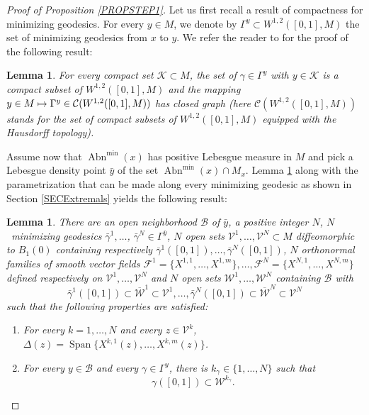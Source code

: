 \documentclass[JEP,XML,SOM,Unicode,NoFloatCountersInSection,published]{cedram}
\newenvironment{enumeratei}
{\bgroup\def\theenumi{\roman{enumi}}\def\theenumii{\arabic{enumii}}\begin{enumerate}}
{\end{enumerate}\egroup}
\newcommand\mto{\mathchoice{\longmapsto}{\mapsto}{\mapsto}{\mapsto}}
\DeclareMathOperator{\Abn}{Abn}
\DeclareMathOperator{\Span}{Span}
\newtheorem{lemma}[theorem]{Lemma}
\theoremstyle{definition}
\begin{document}
\begin{proof}[Proof of Proposition \ref{PROPSTEP1}]
Let us first recall a result of compactness for minimizing geodesics. For every $y\in M$, we denote by $\Gamma^y \subset W^{1,2}([0,1],M)$ the set of minimizing geodesics from $x$ to $y$. We refer the reader to \cite{agrachev01,riffordbook} for the proof of the following result:

\begin{lemma}\label{STEP1_LEM1}
For every compact set $\mathcal{K}\subset M$, the set of $\gamma \in \Gamma^y$ with $y\in \mathcal{K}$ is a compact subset of $W^{1,2}([0,1],M)$ and the mapping $y\in M \mto \Gamma^y \in \mathcal{C}(W^{1,2}([0,1],M))$ has closed graph (here $\mathcal{C}(W^{1,2}([0,1],M))$ stands for the set of compact subsets of $W^{1,2}([0,1],M)$ equipped with the Hausdorff topology).
\end{lemma}

Assume now that $\Abn^{\min}(x)$ has positive Lebesgue measure in $M$ and pick a Lebesgue density point $\bar{y}$ of the set $\Abn^{\min}(x)\cap M_x$. Lemma \ref{STEP1_LEM1} along with the parametrization that can be made along every minimizing geodesic as shown in Section \ref{SECExtremals} yields the following result:

\begin{lemma}\label{STEP1_LEM2}
There are an open neighborhood $\mathcal{B}$ of $\bar{y}$, a positive integer $N$, $N$~minimizing geodesics $\bar{\gamma}^1, \ldots$, $\bar{\gamma}^N \in \Gamma^{\bar{y}}$, $N$ open sets $\mathcal{V}^1, \ldots, \mathcal{V}^N \subset M$ diffeomorphic to $B_1(0)$ containing respectively $\bar{\gamma}^1([0,1]), \ldots, \bar{\gamma}^N([0,1])$, $N$ orthonormal families of smooth vector fields $\mathcal{F}^1 = \{X^{1,1}, \ldots, X^{1,m}\}, \ldots, \mathcal{F}^N = \{X^{N,1}, \ldots, X^{N,m}\}$ defined respectively on $\mathcal{V}^1, \ldots, \mathcal{V}^N$ and $N$ open sets $\mathcal{W}^1, \ldots, \mathcal{W}^N$ containing $\mathcal{B}$ with
\[
\bar{\gamma}^1([0,1]) \subset \overline{\mathcal{W}}^1 \subset \mathcal{V}^1, \ldots, \bar{\gamma}^N([0,1]) \subset \overline{\mathcal{W}}^N \subset \mathcal{V}^N
\]
such that the following properties are satisfied:
\begin{enumeratei}
\item\label{STEP1_LEM2i}
For every $k=1, \ldots, N$ and every $z\in \mathcal{V}^k$, $\Delta(z) = \Span\{X^{k,1}(z), \ldots, X^{k,m}(z)\}$.
\item\label{STEP1_LEM2ii}
For every $y\in \mathcal{B}$ and every $\gamma \in \Gamma^y$, there is $k_{\gamma} \in \{1, \ldots,N\}$ such that
\[
\gamma([0,1]) \subset \mathcal{W}^{k_{\gamma}}.
\]
\end{enumeratei}
\end{lemma}


\end{proof}
\end{document}
